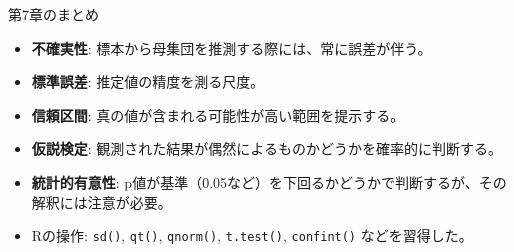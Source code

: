 \documentclass[
  ignorenonframetext,
]{beamer}
\providecommand{\tightlist}{%
  \setlength{\itemsep}{0pt}\setlength{\parskip}{0pt}}
\begin{document}
\begin{frame}[fragile]{第7章のまとめ}
\protect\hypertarget{ux7b2c7ux7ae0ux306eux307eux3068ux3081}{}
\begin{itemize}
\tightlist
\item
  \textbf{不確実性}: 標本から母集団を推測する際には、常に誤差が伴う。
\item
  \textbf{標準誤差}: 推定値の精度を測る尺度。
\item
  \textbf{信頼区間}: 真の値が含まれる可能性が高い範囲を提示する。
\item
  \textbf{仮説検定}:
  観測された結果が偶然によるものかどうかを確率的に判断する。
\item
  \textbf{統計的有意性}:
  p値が基準（0.05など）を下回るかどうかで判断するが、その解釈には注意が必要。
\item
  Rの操作: \texttt{sd()}, \texttt{qt()}, \texttt{qnorm()},
  \texttt{t.test()}, \texttt{confint()} などを習得した。
\end{itemize}
\end{frame}
\end{document}
